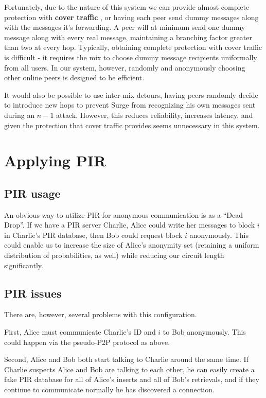 \documentclass[twocolumn,11pt,english]{paper}
\begin{document}
Fortunately, due to the nature of this system we can provide almost complete protection with \textbf{cover traffic} \cite{trickle02}, or having each peer send dummy messages along with the messages it's forwarding. A peer will at minimum send one dummy message along with every real message, maintaining a branching factor greater than two at every hop. Typically, obtaining complete protection with cover traffic is difficult - it requires the mix to choose dummy message recipients uniformally from all users\cite{trickle02}. In our system, however, randomly and anonymously choosing other online peers is designed to be efficient.

It would also be possible to use inter-mix detours\cite{TODO}, having peers randomly decide to introduce new hops to prevent Surge from recognizing his own messages sent during an $n - 1$ attack. However, this reduces reliability, increases latency, and given the protection that cover traffic provides seems unnecessary in this system. 

\section{Applying PIR}
\subsection{PIR usage}
An obvious way to utilize PIR for anonymous communication is as a ``Dead Drop''. If we have a PIR server Charlie, Alice could write her messages to block $i$ in Charlie's PIR database, then Bob could request block $i$ anonymously. This could enable us to increase the size of Alice's anonymity set (retaining a uniform distribution of probabilities, as well) while reducing our circuit length significantly. 

\subsection{PIR issues}
There are, however, several problems with this configuration.

First, Alice must communicate Charlie's ID and $i$ to Bob anonymously. This could happen via the pseudo-P2P protocol as above. 

Second, Alice and Bob both start talking to Charlie around the same time. If Charlie suspects Alice and Bob are talking to each other, he can easily create a fake PIR database for all of Alice's inserts and all of Bob's retrievals, and if they continue to communicate normally he has discovered a connection. 
\end{document}
